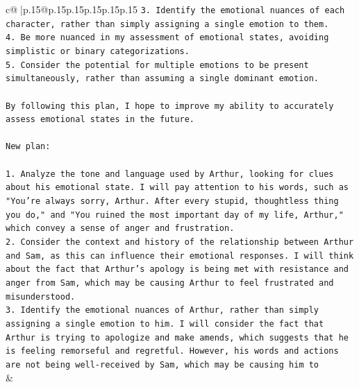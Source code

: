 \documentclass{article}
\begin{document}
{\begin{supertabular}{c@{$\;$}|p{.15\linewidth}@{}p{.15\linewidth}p{.15\linewidth}p{.15\linewidth}p{.15\linewidth}p{.15\linewidth}}
{{{\texttt{3. Identify the emotional nuances of each character, rather than simply assigning a single emotion to them.} \\
\texttt{4. Be more nuanced in my assessment of emotional states, avoiding simplistic or binary categorizations.} \\
\texttt{5. Consider the potential for multiple emotions to be present simultaneously, rather than assuming a single dominant emotion.} \\
\\ 
\texttt{By following this plan, I hope to improve my ability to accurately assess emotional states in the future.} \\
\\ 
\texttt{New plan: } \\
\\ 
\texttt{1. Analyze the tone and language used by Arthur, looking for clues about his emotional state. I will pay attention to his words, such as "You're always sorry, Arthur. After every stupid, thoughtless thing you do," and "You ruined the most important day of my life, Arthur," which convey a sense of anger and frustration.} \\
\texttt{2. Consider the context and history of the relationship between Arthur and Sam, as this can influence their emotional responses. I will think about the fact that Arthur's apology is being met with resistance and anger from Sam, which may be causing Arthur to feel frustrated and misunderstood.} \\
\texttt{3. Identify the emotional nuances of Arthur, rather than simply assigning a single emotion to him. I will consider the fact that Arthur is trying to apologize and make amends, which suggests that he is feeling remorseful and regretful. However, his words and actions are not being well{-}received by Sam, which may be causing him to} \\
            }
        }
    }
    & \\ \\

\end{supertabular}
}
\end{document}
